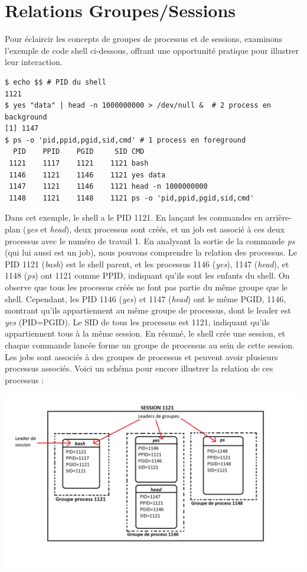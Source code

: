 \section{Relations Groupes/Sessions}

Pour éclaircir les concepts de groupes de processus et de sessions, examinons l'exemple de code shell ci-dessous, offrant une opportunité pratique pour illustrer leur interaction.

\begin{lstlisting}[style=blackstyle]
$ echo $$ # PID du shell
1121
$ yes "data" | head -n 1000000000 > /dev/null &  # 2 process en background
[1] 1147
$ ps -o 'pid,ppid,pgid,sid,cmd' # 1 process en foreground
  PID    PPID    PGID     SID CMD
 1121    1117    1121    1121 bash
 1146    1121    1146    1121 yes data
 1147    1121    1146    1121 head -n 1000000000
 1148    1121    1148    1121 ps -o 'pid,ppid,pgid,sid,cmd'
\end{lstlisting}

Dans cet exemple, le shell a le PID 1121. En lançant les commandes en arrière-plan (\textit{yes} et \textit{head}), deux processus sont créés, et un job est associé à ces deux processus avec le numéro de travail 1. 
En analysant la sortie de la commande \textit{ps} (qui lui aussi est un job), nous pouvons comprendre la relation des processus.
\newline
Le PID 1121 (\textit{bash}) est le shell parent, et les processus 1146 (\textit{yes}), 1147 (\textit{head}), et 1148 (\textit{ps}) ont 1121 comme PPID, indiquant qu'ils sont les enfants du shell. 
On observe que tous les processus créés ne font pas partie du même groupe que le shell. Cependant, les PID 1146 (\textit{yes}) et 1147 (\textit{head}) ont le même PGID, 1146, montrant qu'ils appartiennent au 
même groupe de processus, dont le leader est \textit{yes} (PID=PGID). Le SID de tous les processus est 1121, indiquant qu'ils appartiennent tous à la même session.
\newline
En résumé, le shell crée une session, et chaque commande lancée forme un groupe de processus au sein de cette session. Les jobs sont associés à des groupes de processus et peuvent avoir 
plusieurs processus associés.
\newline
\newline
\newline
Voici un schéma pour encore illustrer la relation de ces processus : 

\includegraphics[width=1\textwidth]{img/relationshipSchema.png}